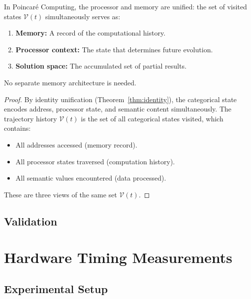 \begin{theorem}
\label{thm:proc_mem}
In Poincar\'{e} Computing, the processor and memory are unified: the set of visited states $\mathcal{V}(t)$ simultaneously serves as:
\begin{enumerate}
    \item \textbf{Memory:} A record of the computational history.
    \item \textbf{Processor context:} The state that determines future evolution.
    \item \textbf{Solution space:} The accumulated set of partial results.
\end{enumerate}
No separate memory architecture is needed.
\end{theorem}

\begin{proof}
By identity unification (Theorem~\ref{thm:identity}), the categorical state encodes address, processor state, and semantic content simultaneously. The trajectory history $\mathcal{V}(t)$ is the set of all categorical states visited, which contains:
\begin{itemize}
    \item All addresses accessed (memory record).
    \item All processor states traversed (computation history).
    \item All semantic values encountered (data processed).
\end{itemize}
These are three views of the same set $\mathcal{V}(t)$.
\end{proof}


\subsection{Validation}
\label{part:validation}

\section{Hardware Timing Measurements}
\label{sec:hardware}

\subsection{Experimental Setup}

